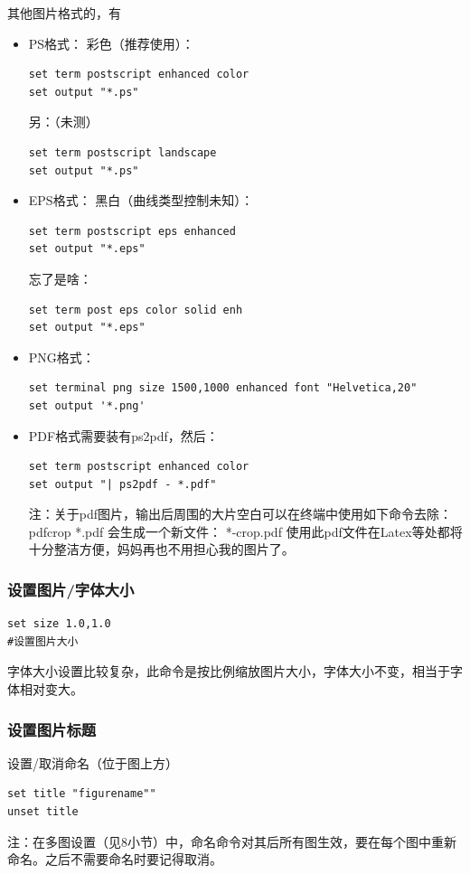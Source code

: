 其他图片格式的，有
\begin{itemize}
\item PS格式：
彩色（推荐使用）：
\begin{verbatim}
set term postscript enhanced color
set output "*.ps"
\end{verbatim}
另：（未测）
\begin{verbatim}
set term postscript landscape
set output "*.ps"
\end{verbatim}

\item EPS格式：
黑白（曲线类型控制未知）：
\begin{verbatim}
set term postscript eps enhanced
set output "*.eps"
\end{verbatim}
忘了是啥：
\begin{verbatim}
set term post eps color solid enh
set output "*.eps"
\end{verbatim}

\item PNG格式：
\begin{verbatim}
set terminal png size 1500,1000 enhanced font "Helvetica,20"
set output '*.png'
\end{verbatim}

\item PDF格式需要装有ps2pdf，然后：
\begin{verbatim}
set term postscript enhanced color
set output "| ps2pdf - *.pdf"
\end{verbatim}

注：关于pdf图片，输出后周围的大片空白可以在终端中使用如下命令去除：
pdfcrop *.pdf
会生成一个新文件： *-crop.pdf
使用此pdf文件在Latex等处都将十分整洁方便，妈妈再也不用担心我的图片了。
\end{itemize}


\subsubsection{设置图片/字体大小}
\begin{verbatim}
set size 1.0,1.0
#设置图片大小
\end{verbatim}
字体大小设置比较复杂，此命令是按比例缩放图片大小，字体大小不变，相当于字体相对变大。


\subsubsection{设置图片标题}
 设置/取消命名（位于图上方）
 \begin{verbatim}
set title "figurename""
unset title
\end{verbatim}
注：在多图设置（见8小节）中，命名命令对其后所有图生效，要在每个图中重新命名。之后不需要命名时要记得取消。



